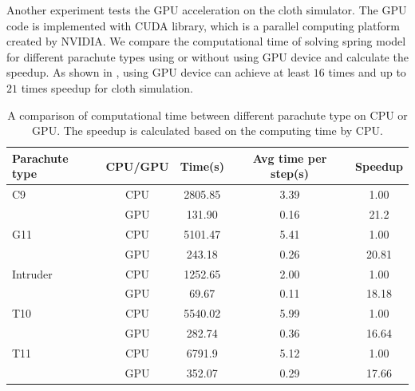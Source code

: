 Another experiment tests the GPU acceleration on the cloth simulator. The GPU 
code is implemented with CUDA library, which is a parallel computing platform 
created by NVIDIA. We compare the computational time of solving spring model 
for different parachute types using or without using GPU device and calculate 
the speedup. As shown in , using GPU device can achieve at 
least $16$ times and up to $21$ times speedup for cloth simulation.  

\begin{table}[!htbp]\center
\small
\begin{tabular}{lcccc}
\hline\hline
Parachute type & CPU/GPU & Time(s) & Avg time per step(s) & Speedup\\
\hline
C9 & CPU & 2805.85 & 3.39 & 1.00 \\
{} & GPU & 131.90 & 0.16  & 21.2 \\

\hline
G11 & CPU & 5101.47 & 5.41 & 1.00 \\
{} & GPU & 243.18 & 0.26 & 20.81 \\

\hline
Intruder & CPU & 1252.65 & 2.00 & 1.00 \\
{} & GPU & 69.67 & 0.11 & 18.18 \\

\hline
T10 	& CPU & 5540.02 & 5.99 & 1.00 \\
{} & GPU & 282.74 & 0.36 & 16.64\\

\hline
T11 & CPU & 6791.9 & 5.12 & 1.00 \\
{} & GPU & 352.07 & 0.29 & 17.66\\
\hline
\end{tabular}
\caption{A comparison of computational time between different parachute type on CPU or GPU. The speedup is calculated based on the computing time by CPU. \label{gpu_speedup}}
\end{table}
\newpage{}
